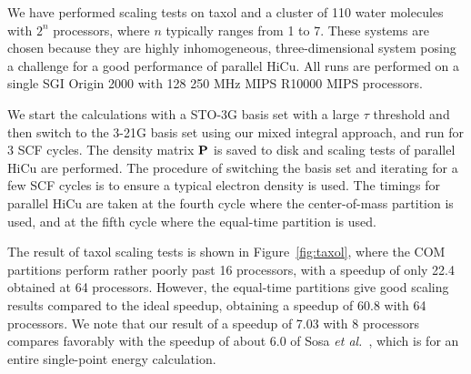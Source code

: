 \commentoutA{\documentclass[prb,aps,twocolumn,twocolumngrid]{revtex4}}
\begin{document}

We have performed scaling tests on taxol and a cluster of 110 water
molecules with $2^n$ processors, where $n$ typically ranges from 1 to
7.  These systems are chosen because they are highly inhomogeneous,
three-dimensional system posing a challenge for a good performance of 
parallel HiCu.  All runs are performed on a single SGI Origin 2000 
with 128 250 MHz MIPS R10000 MIPS processors. 

We start the calculations with a STO-3G basis set with a large $\tau$
threshold and then switch to the 3-21G basis set using our mixed integral
approach, and run for 3 SCF cycles.  The density matrix ${\bf P}$ is saved to 
disk and scaling tests of parallel HiCu are performed.  The procedure of 
switching the basis set and iterating for a few SCF cycles is to ensure a 
typical electron density is used. The timings for parallel HiCu are taken 
at the fourth cycle where the center-of-mass partition is used, and at the 
fifth cycle where the equal-time partition is used.  

The result of taxol scaling tests is shown in Figure~\ref{fig:taxol}, 
where the COM partitions perform rather poorly past 16 processors,
with a speedup of only 22.4 obtained at 64 processors.  However,
the equal-time partitions give good scaling results compared to the
ideal speedup, obtaining a speedup of 60.8 with 64 processors.  We
note that our result of a speedup of 7.03 with 8 processors compares
favorably with the speedup of about 6.0 of Sosa {\it et al.}~\cite{Sosa_00v26}, 
which is for an entire single-point energy calculation.
\end{document}
